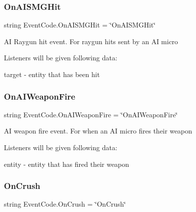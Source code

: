\subsubsection{\texorpdfstring{OnAISMGHit}{OnAISMGHit}}
{\footnotesize\ttfamily string Event\+Code.\+On\+A\+I\+S\+M\+G\+Hit = \char`\"{}On\+A\+I\+S\+M\+G\+Hit\char`\"{}\hspace{0.3cm}{\ttfamily [static]}}



AI Raygun hit event. For raygun hits sent by an AI micro 

Listeners will be given following data\+:
\begin{DoxyItemize}
\item {\ttfamily target} -\/ entity that has been hit 
\end{DoxyItemize}\mbox{\label{class_event_code_a6c5540673e62192cd85f1ef886e8076e}} 
\subsubsection{\texorpdfstring{OnAIWeaponFire}{OnAIWeaponFire}}
{\footnotesize\ttfamily string Event\+Code.\+On\+A\+I\+Weapon\+Fire = \char`\"{}On\+A\+I\+Weapon\+Fire\char`\"{}\hspace{0.3cm}{\ttfamily [static]}}



AI weapon fire event. For when an AI micro fires their weapon 

Listeners will be given following data\+:
\begin{DoxyItemize}
\item {\ttfamily entity} -\/ entity that has fired their weapon 
\end{DoxyItemize}\mbox{\label{class_event_code_a279c4c5e28c223c4a5c590af25823780}} 
\subsubsection{\texorpdfstring{OnCrush}{OnCrush}}
{\footnotesize\ttfamily string Event\+Code.\+On\+Crush = \char`\"{}On\+Crush\char`\"{}\hspace{0.3cm}{\ttfamily [static]}}



